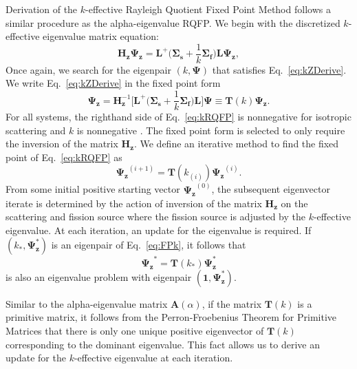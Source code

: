 Derivation of the $k$-effective Rayleigh Quotient Fixed Point Method follows a similar procedure as the alpha-eigenvalue RQFP. We begin with the discretized $k$-effective eigenvalue matrix equation:
\begin{equation}
	\mathbf{H_{z}} \mathbf{\Psi_{z}} = \mathbf{L}^{+} \bigg ( \mathbf{\Sigma_{s}} + \frac{1}{k}\mathbf{\Sigma_{f}} \bigg ) \mathbf{L} \mathbf{\Psi_{z}},
	\label{eq:kZDerive}
\end{equation}
Once again, we search for the eigenpair $(k, \mathbf{\Psi})$ that satisfies Eq.~\ref{eq:kZDerive}. We write Eq.~\ref{eq:kZDerive} in the fixed point form
\begin{equation}
	\mathbf{\Psi_{z}} = \mathbf{H}^{-1}_{\mathbf{z}} \bigg [ \mathbf{L}^{+} \bigg ( \mathbf{\Sigma_{s}} + \frac{1}{k} \mathbf{\Sigma_{f}} \bigg ) \mathbf{L} \bigg ] \mathbf{\Psi} \equiv \mathbf{T}(k) \mathbf{\Psi_{z}}.
	\label{eq:kRQFP}
\end{equation}
For all systems, the righthand side of Eq.~\ref{eq:kRQFP} is nonnegative for isotropic scattering and $k$ is nonnegative \cite{warsa_krylov_2004}. The fixed point form is selected to only require the inversion of the matrix $\mathbf{H}_{\mathbf{z}}$.
We define an iterative method to find the fixed point of Eq.~\ref{eq:kRQFP} as
\begin{equation}
	\mathbf{\Psi_{z}}^{(i+1)} = \mathbf{T}(k_{(i)}) \mathbf{\Psi_{z}}^{(i)}.
	\label{eq:FPk}
\end{equation}
From some initial positive starting vector $\mathbf{\Psi_{z}}^{(0)}$, the subsequent eigenvector iterate is determined by the action of inversion of the matrix $\mathbf{H_{z}}$ on the scattering and fission source where the fission source is adjusted by the $k$-effective eigenvalue. At each iteration, an update for the eigenvalue is required. If $(k_{*},\mathbf{\Psi}_\mathbf{z}^{*})$ is an eigenpair of Eq.~\ref{eq:FPk}, it follows that
\begin{equation}
	\mathbf{\Psi_{z}}^{*} = \mathbf{T}(k_{*}) \mathbf{\Psi}_\mathbf{z}^{*}
\end{equation}
is also an eigenvalue problem with eigenpair $(\mathbf{1},\mathbf{\Psi}_\mathbf{z}^{*})$.

Similar to the alpha-eigenvalue matrix $\mathbf{A}(\alpha)$, if the matrix $\mathbf{T}(k)$ is a primitive matrix, it follows from the Perron-Froebenius Theorem for Primitive Matrices that there is only one unique positive eigenvector of $\mathbf{T}(k)$ corresponding to the dominant eigenvalue. This fact allows us to derive an update for the $k$-effective eigenvalue at each iteration.

